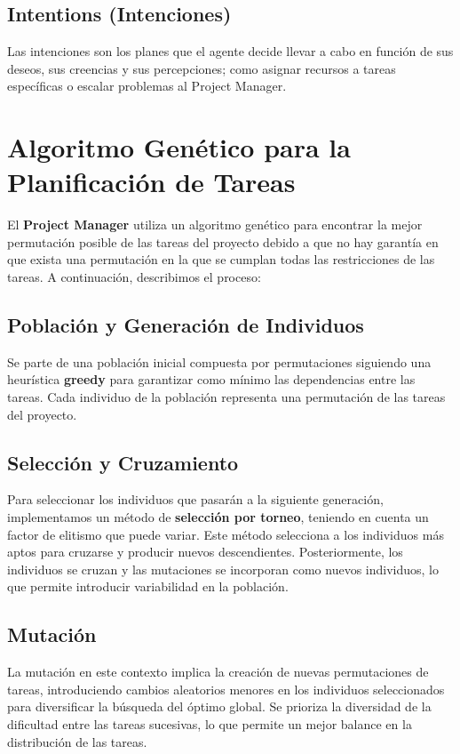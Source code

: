 \documentclass[a4paper, 12pt]{article}
\begin{document}
\subsection{Intentions (Intenciones)}
Las intenciones son los planes que el agente decide llevar a cabo en función de sus deseos, sus creencias y sus percepciones; como asignar recursos a tareas específicas o escalar problemas al Project Manager.

\section{Algoritmo Genético para la Planificación de Tareas}
El \textbf{Project Manager} utiliza un algoritmo genético para encontrar la mejor permutación posible de las tareas del proyecto debido a que no hay garant\'ia en que exista una permutación en la que se cumplan todas las restricciones de las tareas. A continuación, describimos el proceso:

\subsection{Población y Generación de Individuos}
Se parte de una población inicial compuesta por permutaciones siguiendo una heurística \textbf{greedy} para garantizar como m\'inimo las dependencias entre las tareas. Cada individuo de la población representa una permutación de las tareas del proyecto.

\subsection{Selección y Cruzamiento}
Para seleccionar los individuos que pasarán a la siguiente generación, implementamos un método de \textbf{selección por torneo}, teniendo en cuenta un factor de elitismo que puede variar. Este método selecciona a los individuos más aptos para cruzarse y producir nuevos descendientes. Posteriormente, los individuos se cruzan y las mutaciones se incorporan como nuevos individuos, lo que permite introducir variabilidad en la población.

\subsection{Mutación}
La mutación en este contexto implica la creación de nuevas permutaciones de tareas, introduciendo cambios aleatorios menores en los individuos seleccionados para diversificar la búsqueda del óptimo global. Se prioriza la diversidad de la dificultad entre las tareas sucesivas, lo que permite un mejor balance en la distribución de las tareas.
\end{document}
